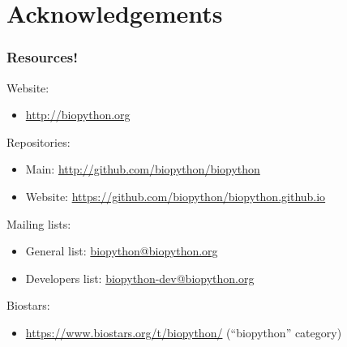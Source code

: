 \documentclass[trans]{beamer}
\begin{document}
\section*{Acknowledgements}
\frame
{
  \frametitle{Resources!}

  Website:\\
  \begin{itemize}
  \item \url{http://biopython.org}
  \end{itemize}

  Repositories:\\
  \begin{itemize}
  \item Main: \url{http://github.com/biopython/biopython}
  \item Website: \url{https://github.com/biopython/biopython.github.io}
  \end{itemize}

  Mailing lists:
  \begin{itemize}
  \item General list: \url{biopython@biopython.org}
  \item Developers list: \url{biopython-dev@biopython.org}
  \end{itemize}

  Biostars:
  \begin{itemize}
  \item \url{https://www.biostars.org/t/biopython/} (``biopython'' category)
  \end{itemize}
}
\end{document}
